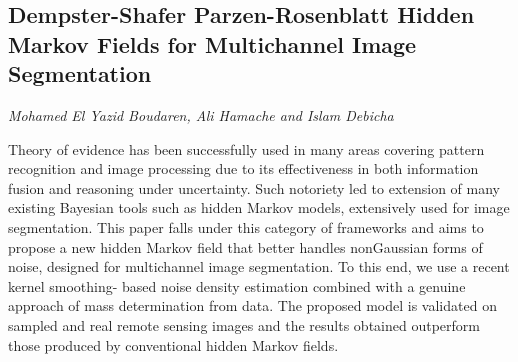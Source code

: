 \documentclass[../booklet.tex]{subfiles}
\begin{document}
\subsection[Dempster-Shafer Parzen-Rosenblatt Hidden Markov Fields for Multichannel Image Segmentation. {\it Mohamed El Yazid Boudaren, Ali Hamache and Islam Debicha}]{Dempster-Shafer Parzen-Rosenblatt Hidden Markov Fields for Multichannel Image Segmentation}
  

\begin{center}
  {\it Mohamed El Yazid Boudaren, Ali Hamache and Islam Debicha}
\end{center}



Theory of evidence has been successfully used in many areas covering pattern recognition and image processing due to its effectiveness in both information fusion and reasoning under uncertainty. Such notoriety led to extension of many existing Bayesian tools such as hidden Markov models, extensively used for image segmentation.
This paper falls under this category of frameworks and aims to propose a new hidden Markov field that better handles nonGaussian forms of noise, designed for multichannel image segmentation. To this end, we use a recent kernel smoothing- based noise density estimation combined with a genuine approach of mass determination from data. The proposed model is validated on sampled and real remote sensing images and the results obtained outperform those produced by conventional hidden Markov fields.
\end{document}
